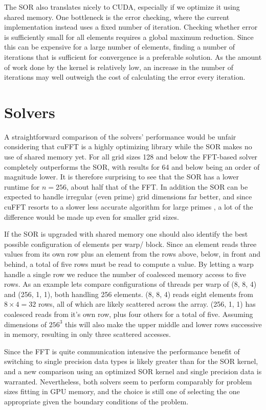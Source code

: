 The SOR also translates nicely to CUDA, especially if we optimize it using shared memory. One bottleneck is the error
checking, where the current implementation instead uses a fixed number of iteration. Checking whether error is
sufficiently small for all elements requires a global maximum reduction. Since this can be expensive for a large number
of elements, finding a number of iterations that is sufficient for convergence is a preferable solution. As the amount
of work done by the kernel is relatively low, an increase in the number of iterations may well outweigh the cost of
calculating the error every iteration.

\section{Solvers}
A straightforward comparison of the solvers' performance would be unfair considering that cuFFT is a highly optimizing
library while the SOR makes no use of shared memory yet. For all grid sizes 128 and below the FFT-based solver
completely outperforms the SOR, with results for 64 and below being an order of magnitude lower. It is therefore
surprising to see that the SOR has a lower runtime for $n=256$, about half that of the FFT. In addition the SOR can be
expected to handle irregular (even prime) grid dimensions far better, and since cuFFT resorts to a slower less accurate
algorithm for large primes \cite[sec.~2.12]{cufft-doc}, a lot of the difference would be made up even for smaller grid
sizes.

If the SOR is upgraded with shared memory one should also identify the best possible configuration of elements per warp/
block. Since an element reads three values from its own row plus an element from the rows above, below, in front and
behind, a total of five rows must be read to compute a value. By letting a warp handle a single row we reduce the number of coalesced
memory access to five rows. As an example lets compare configurations of threads per warp of (8, 8, 4) and (256, 1, 1),
both handling 256 elements. (8, 8, 4) reads eight elements from $8\times 4 = 32$ rows, all of which are likely scattered across
the array. (256, 1, 1) has coalesced reads from it's own row, plus four others for a total of five. Assuming dimensions
of $256^3$ this will also make the upper middle and lower rows successive in memory, resulting in only three scattered
accesses.

Since the FFT is quite communication intensive the performance benefit of switching to single precision data types is
likely greater than for the SOR kernel, and a new comparison using an optimized SOR kernel and single precision data is
warranted. Nevertheless, both solvers seem to perform comparably for problem sizes fitting in GPU memory, and the choice
is still one of selecting the one appropriate given the boundary conditions of the problem.